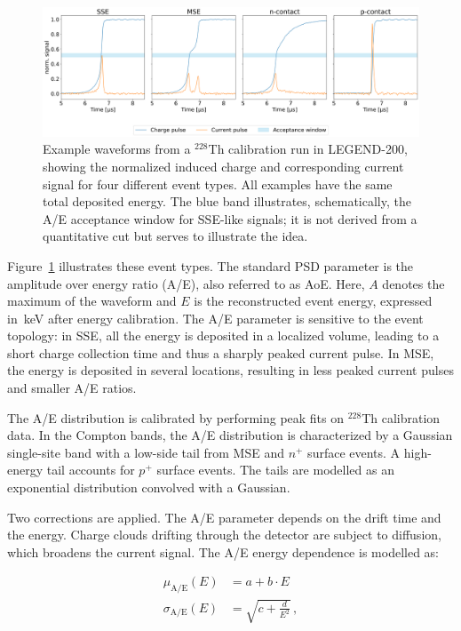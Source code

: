 \begin{figure}[t]
    \centering
    \includegraphics[width=\linewidth]{figures/03_legend/PSD_topology.png}
    \caption{Example waveforms from a $^{228}$Th calibration run in LEGEND-200, showing the normalized induced charge and corresponding current signal for four different event types. All examples have the same total deposited energy. The blue band illustrates, schematically, the A/E acceptance window for SSE-like signals; it is not derived from a quantitative cut but serves to illustrate the idea.}
    \label{fig:PSD_topology}
\end{figure}

Figure~\ref{fig:PSD_topology} illustrates these event types.
The standard PSD parameter is the amplitude over energy ratio (A/E), also referred to as AoE. Here, $A$ denotes the maximum of the waveform and $E$ is the reconstructed event energy, expressed in~keV after energy calibration. The A/E parameter is sensitive to the event topology: in SSE, all the energy is deposited in a localized volume, leading to a short charge collection time and thus a sharply peaked current pulse. In MSE, the energy is deposited in several locations, resulting in less peaked current pulses and smaller A/E ratios. 

The A/E distribution is calibrated by performing peak fits on $^{228}$Th calibration data. In the Compton bands, the A/E distribution is characterized by a Gaussian single-site band with a low-side tail from MSE and $n^{+}$ surface events. A high-energy tail accounts for $p^{+}$ surface events. The tails are modelled as an exponential distribution convolved with a Gaussian. 

Two corrections are applied. The A/E parameter depends on the drift time and the energy. Charge clouds drifting through the detector are subject to diffusion, which broadens the current signal. The A/E energy dependence is modelled as:

\begin{align}
\label{eq:AoE_energydep_mu}
\mu_{\mathrm{A/E}}(E) & = a + b \cdot E \\
\sigma_{\mathrm{A/E}}(E) & = \sqrt{c + \frac{d}{E^2}}
\label{eq:AoE_energydep_sigma} \,,
\end{align}

